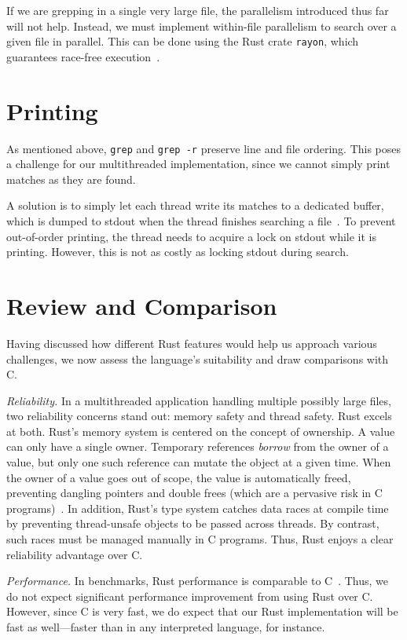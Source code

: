 \documentclass[letterpaper,twocolumn,10pt]{article}
\newcommand{\grep}{\texttt{grep}}
\newcommand{\grepr}{\texttt{grep -r}}
\begin{document}
If we are grepping in a single very large file, the parallelism introduced thus far will not help.
Instead, we must implement within-file parallelism to search over a given file in parallel.
This can be done using the Rust crate \texttt{rayon}, which guarantees race-free execution~\cite{rayon}.


\section{Printing}

As mentioned above, \grep{} and \grepr{} preserve line and file ordering.
This poses a challenge for our multithreaded implementation, since we cannot simply print matches as they are found.

A solution is to simply let each thread write its matches to a dedicated buffer, which is dumped to stdout when the thread finishes searching a file~\cite{gallantRipgrepBlog}.
To prevent out-of-order printing, the thread needs to acquire a lock on stdout while it is printing.
However, this is not as costly as locking stdout during search.

\section{Review and Comparison}

Having discussed how different Rust features would help us approach various challenges, we now assess the language's suitability and draw comparisons with C.

\emph{Reliability.} In a multithreaded application handling multiple possibly large files, two reliability concerns stand out: memory safety and thread safety.
Rust excels at both.
Rust's memory system is centered on the concept of ownership.
A value can only have a single owner.
Temporary references \emph{borrow} from the owner of a value, but only one such reference can mutate the object at a given time.
When the owner of a value goes out of scope, the value is automatically freed, preventing dangling pointers and double frees (which are a pervasive risk in C programs)~\cite{Klabnik_Nichols_Krycho_2026}.
In addition, Rust's type system catches data races at compile time by preventing thread-unsafe objects to be passed across threads.
By contrast, such races must be managed manually in C programs.
Thus, Rust enjoys a clear reliability advantage over C.

\emph{Performance.} In benchmarks, Rust performance is comparable to C~\cite{benchmarks}.
Thus, we do not expect significant performance improvement from using Rust over C.
However, since C is very fast, we do expect that our Rust implementation will be fast as well---faster than in any interpreted language, for instance.
\end{document}
